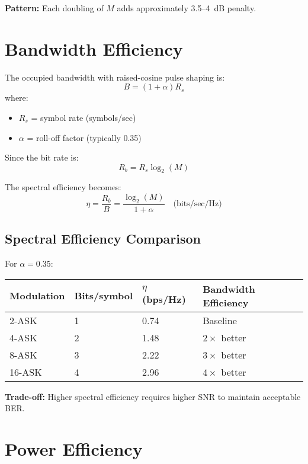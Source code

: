 \textbf{Pattern:} Each doubling of $M$ adds approximately 3.5--4~dB penalty.

\section{Bandwidth Efficiency}

The occupied bandwidth with raised-cosine pulse shaping is:
\begin{equation}
B = (1 + \alpha) R_s
\end{equation}
where:
\begin{itemize}
\item $R_s$ = symbol rate (symbols/sec)
\item $\alpha$ = roll-off factor (typically 0.35)
\end{itemize}

Since the bit rate is:
\begin{equation}
R_b = R_s \log_2(M)
\end{equation}

The spectral efficiency becomes:
\begin{equation}
\eta = \frac{R_b}{B} = \frac{\log_2(M)}{1 + \alpha} \quad \text{(bits/sec/Hz)}
\end{equation}

\subsection{Spectral Efficiency Comparison}

For $\alpha = 0.35$:

\begin{center}
\begin{tabular}{@{}llll@{}}
\toprule
Modulation & Bits/symbol & $\eta$ (bps/Hz) & Bandwidth Efficiency \\
\midrule
2-ASK & 1 & 0.74 & Baseline \\
4-ASK & 2 & 1.48 & $2\times$ better \\
8-ASK & 3 & 2.22 & $3\times$ better \\
16-ASK & 4 & 2.96 & $4\times$ better \\
\bottomrule
\end{tabular}
\end{center}

\textbf{Trade-off:} Higher spectral efficiency requires higher SNR to maintain acceptable BER.

\section{Power Efficiency}

